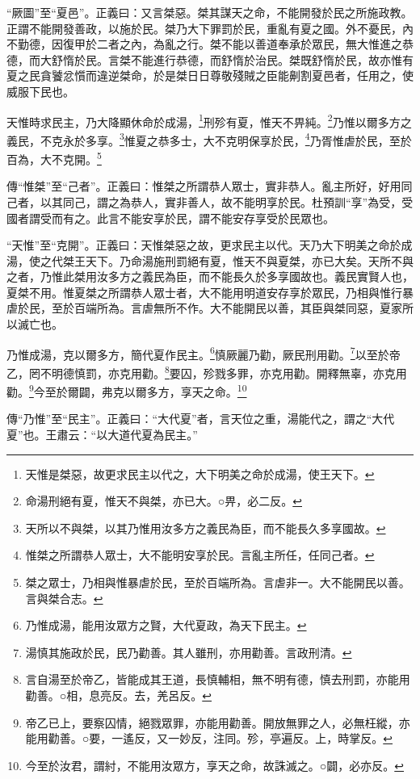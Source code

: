 {\noindent\shu{}\fzkt “厥圖”至“夏邑”。正義曰：又言桀惡。桀其謀天之命，不能開發於民之所施政教。正謂不能開發善政，以施於民。桀乃大下罪罰於民，重亂有夏之國。外不憂民，內不勤德，因復甲於二者之內，為亂之行。桀不能以善道奉承於眾民，無大惟進之恭德，而大舒惰於民。言桀不能進行恭德，而舒惰於治民。桀既舒惰於民，故亦惟有夏之民貪饕忿懫而違逆桀命，於是桀日日尊敬殘賊之臣能劓割夏邑者，任用之，使威服下民也。 \par}

天惟時求民主，乃大降顯休命於成湯，\footnote{天惟是桀惡，故更求民主以代之，大下明美之命於成湯，使王天下。}刑殄有夏，惟天不畀純。\footnote{命湯刑絕有夏，惟天不與桀，亦已大。○畀，必二反。}乃惟以爾多方之義民，不克永於多享。\footnote{天所以不與桀，以其乃惟用汝多方之義民為臣，而不能長久多享國故。}惟夏之恭多士，大不克明保享於民，\footnote{惟桀之所謂恭人眾士，大不能明安享於民。言亂主所任，任同己者。}乃胥惟虐於民，至於百為，大不克開。\footnote{桀之眾士，乃相與惟暴虐於民，至於百端所為。言虐非一。大不能開民以善。言與桀合志。}


{\noindent\zhuan{}\fzbyks 傳“惟桀”至“己者”。正義曰：惟桀之所謂恭人眾士，實非恭人。亂主所好，好用同己者，以其同己，謂之為恭人，實非善人，故不能明享於民。杜預訓“享”為受，受國者謂受而有之。此言不能安享於民，謂不能安存享受於民眾也。 \par}

{\noindent\shu{}\fzkt “天惟”至“克開”。正義曰：天惟桀惡之故，更求民主以代。天乃大下明美之命於成湯，使之代桀王天下。乃命湯施刑罰絕有夏，惟天不與夏桀，亦已大矣。天所不與之者，乃惟此桀用汝多方之義民為臣，而不能長久於多享國故也。義民實賢人也，夏桀不用。惟夏桀之所謂恭人眾士者，大不能用明道安存享於眾民，乃相與惟行暴虐於民，至於百端所為。言虐無所不作。大不能開民以善，其臣與桀同惡，夏家所以滅亡也。 \par}

乃惟成湯，克以爾多方，簡代夏作民主。\footnote{乃惟成湯，能用汝眾方之賢，大代夏政，為天下民主。}慎厥麗乃勸，厥民刑用勸。\footnote{湯慎其施政於民，民乃勸善。其人雖刑，亦用勸善。言政刑清。}以至於帝乙，罔不明德慎罰，亦克用勸。\footnote{言自湯至於帝乙，皆能成其王道，長慎輔相，無不明有德，慎去刑罰，亦能用勸善。○相，息亮反。去，羌呂反。}要囚，殄戮多罪，亦克用勸。開釋無辜，亦克用勸。\footnote{帝乙已上，要察囚情，絕戮眾罪，亦能用勸善。開放無罪之人，必無枉縱，亦能用勸善。○要，一遙反，又一妙反，注同。殄，亭遍反。上，時掌反。}今至於爾闢，弗克以爾多方，享天之命。\footnote{今至於汝君，謂紂，不能用汝眾方，享天之命，故誅滅之。○闢，必亦反。}


{\noindent\zhuan{}\fzbyks 傳“乃惟”至“民主”。正義曰：“大代夏”者，言天位之重，湯能代之，謂之“大代夏”也。王肅云：“以大道代夏為民主。” \par}

